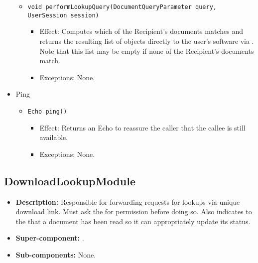 \begin{itemize}
\begin{itemize}
		\item \texttt{void performLookupQuery(DocumentQueryParameter query, UserSession session)}
		\begin{itemize}
			\item Effect: Computes which of the Recipient's documents matches  and returns the resulting list of  objects directly to the user's software via . Note that this list may be empty if none of the Recipient's documents match.
			\item Exceptions: None.
		\end{itemize}
	\end{itemize}

	\item Ping
	\begin{itemize}
		\item \texttt{Echo ping()}
		\begin{itemize}
			\item Effect: Returns an Echo to reassure the caller that the callee is still available.
			\item Exceptions: None.
		\end{itemize}
	\end{itemize}
\end{itemize}

\subsection{DownloadLookupModule}
\begin{itemize}
    \item \textbf{Description:} Responsible for forwarding requests for lookups via unique download link. Must ask the  for permission before doing so. Also indicates to the  that a document has been read so it can appropriately update its status.
    \item \textbf{Super-component:} .
    \item \textbf{Sub-components:} None.
\end{itemize}

